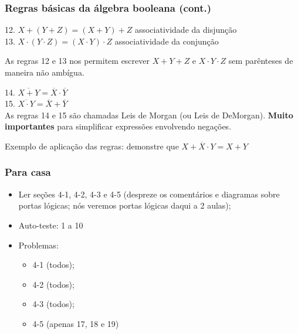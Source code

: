 \documentclass{beamer}
\begin{document}

\begin{frame}
 \frametitle{Regras básicas da álgebra booleana (cont.)}

12. $X + (Y + Z) = (X + Y) + Z$ \hspace{4ex} {\footnotesize{associatividade da disjunção}} \pause \\[6pt]

13. $X \cdot (Y \cdot Z) = (X \cdot Y) \cdot Z$ \hspace{4ex} {\footnotesize{associatividade da conjunção}} \\

\vspace{6pt}

\pause

As regras 12 e 13 nos permitem escrever $X+Y+Z$ e $X\cdot Y \cdot Z$ sem parênteses de maneira não ambígua.\\[6pt]


\pause

\vspace{6pt}

\pause

14. $\overline{X + Y} = \overline{X} \cdot \overline{Y}$ \\[6pt]
15. $\overline{X \cdot Y} = \overline{X} + \overline{Y}$ \\[6pt]

As regras 14 e 15 são chamadas Leis de Morgan (ou Leis de DeMorgan). \textbf{Muito importantes} para simplificar expressões envolvendo negações.\\[12pt]

\pause

Exemplo de aplicação das regras: demonstre que $X + \overline{X} \cdot Y = X + Y$

\end{frame}


\begin{frame}
\frametitle{Para casa}

\begin{itemize}
  \item Ler seções 4-1, 4-2, 4-3 e 4-5 (despreze os comentários e
        diagramas sobre portas lógicas; nós veremos portas lógicas
        daqui a 2 aulas);
  \item Auto-teste: 1 a 10
  \item Problemas:
        \begin{itemize}
          \item 4-1 (todos);
          \item 4-2 (todos);
          \item 4-3 (todos);
          \item 4-5 (apenas 17, 18 e 19)
        \end{itemize}
\end{itemize}

\end{frame}
\end{document}
